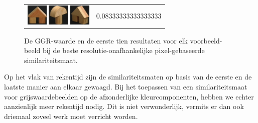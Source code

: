 \begin{figure}[tbp]
\begin{center}
\begin{tabular}{m{11cm} | m{3cm} |}
\includegraphics[width=1cm]{coil/beeld-43.eps}
\includegraphics[width=1cm]{coil/beeld-3.eps}
\includegraphics[width=1cm]{coil/beeld-46.eps}
& {\scriptsize 0.08333333333333333}
\end{tabular}
\caption{\label{fig:results_beste_pixelgeb}De GGR-waarde en de eerste tien resultaten voor elk voorbeeld-beeld bij de beste resolutie-onafhankelijke pixel-gebaseerde similariteitsmaat.}
\end{center}
\end{figure}

Op het vlak van rekentijd zijn de similariteitsmaten op basis van de eerste en de laatste manier
aan elkaar gewaagd. Bij het toepassen van een similariteitsmaat voor grijswaardebeelden op de 
afzonderlijke kleurcomponenten, hebben we echter aanzienlijk meer rekentijd nodig. Dit is niet
verwonderlijk, vermits er dan ook driemaal zoveel werk moet verricht worden.
